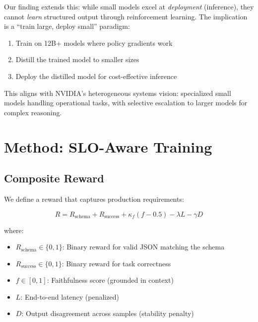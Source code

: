 \documentclass[11pt]{article}
\begin{document}
Our finding extends this: while small models excel at \emph{deployment} (inference), they cannot \emph{learn} structured output through reinforcement learning.
The implication is a ``train large, deploy small'' paradigm:
\begin{enumerate}[leftmargin=12pt]
    \item Train on 12B+ models where policy gradients work
    \item Distill the trained model to smaller sizes
    \item Deploy the distilled model for cost-effective inference
\end{enumerate}

This aligns with NVIDIA's heterogeneous systems vision: specialized small models handling operational tasks, with selective escalation to larger models for complex reasoning.

\section{Method: SLO-Aware Training}

\subsection{Composite Reward}

We define a reward that captures production requirements:

\begin{equation}
R = R_{\text{schema}} + R_{\text{success}} + \kappa_f (f - 0.5) - \lambda L - \gamma D
\end{equation}

where:
\begin{itemize}[leftmargin=12pt]
    \item $R_{\text{schema}} \in \{0, 1\}$: Binary reward for valid JSON matching the schema
    \item $R_{\text{success}} \in \{0, 1\}$: Binary reward for task correctness
    \item $f \in [0, 1]$: Faithfulness score (grounded in context)
    \item $L$: End-to-end latency (penalized)
    \item $D$: Output disagreement across samples (stability penalty)
\end{itemize}
\end{document}
